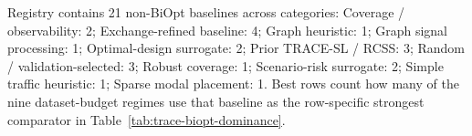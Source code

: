 \begin{table}[pos=htbp]
\begin{tabularx}{\textwidth}{>{\raggedright\arraybackslash}p{}>{\raggedright\arraybackslash}p{}>{\centering\arraybackslash}p{}>{\centering\arraybackslash}X}
\bottomrule
\end{tabularx}
\begin{flushleft}\footnotesize Registry contains 21 non-BiOpt baselines across categories: Coverage / observability: 2; Exchange-refined baseline: 4; Graph heuristic: 1; Graph signal processing: 1; Optimal-design surrogate: 2; Prior TRACE-SL / RCSS: 3; Random / validation-selected: 3; Robust coverage: 1; Scenario-risk surrogate: 2; Simple traffic heuristic: 1; Sparse modal placement: 1. Best rows count how many of the nine dataset-budget regimes use that baseline as the row-specific strongest comparator in Table~\ref{tab:trace-biopt-dominance}.\end{flushleft}
\end{table}
